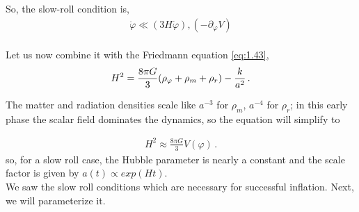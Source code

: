 So, the slow-roll condition is,
\begin{align}
     \ddot{\varphi} \ll (3H\dot{\varphi}),(-\partial_{\varphi} V )\label{2.31}
\end{align}\\
Let us now combine it with the Friedmann equation  \ref{eq:1.43},
\begin{align}
    H^2 = \frac{8 \pi G}{3} \qty(\rho _\varphi + \rho _m + \rho _r) - \frac{k}{a^2}\,.
\end{align}

The matter and radiation densities scale like \(a^{-3}\) for \(\rho _m\), \(a^{-4}\) for \(\rho _r\); in this early phase the scalar field dominates the dynamics, so the equation will simplify to 

\begin{align} \label{2.33}
    H^2 \approx \frac{8 \pi G}{3} V(\varphi)\,.
\end{align}
so, for a slow roll case, the Hubble parameter is nearly a constant and the scale factor is given by $a(t) \propto exp(Ht)$.\\
\hspace{0.5cm} We saw the slow roll conditions which are necessary for successful inflation. Next, we will parameterize it.

